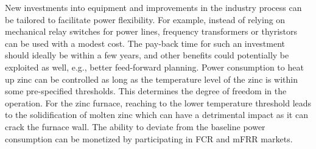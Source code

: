 \documentclass[conference]{IEEEtran}
\begin{document}

New investments into equipment and improvements in the industry process can be tailored to facilitate power flexibility. For example, instead of relying on mechanical relay switches for power lines, frequency transformers or thyristors can be used with a modest cost. The pay-back time for such an investment should ideally be within a few years, and other benefits could potentially be exploited as well, e.g., better feed-forward planning.
%
%
%
Power consumption to heat up zinc can be controlled as long as the temperature level of the zinc is within some pre-specified thresholds. This determines the degree of freedom in the operation. For the zinc furnace, reaching to the lower temperature threshold leads to the solidification of molten zinc which can have a detrimental impact as it can crack the furnace wall.
The ability to deviate from the baseline power consumption can be monetized by participating in FCR and mFRR markets. 


\end{document}
